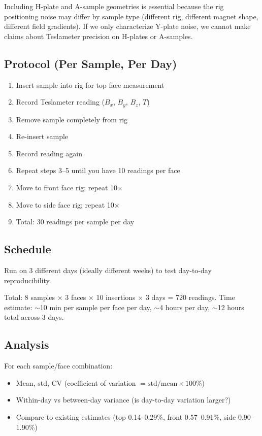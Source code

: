 \documentclass[11pt,letterpaper]{article}
\begin{document}
Including H-plate and A-sample geometries is essential because the rig
positioning noise may differ by sample type (different rig, different magnet
shape, different field gradients). If we only characterize Y-plate noise, we
cannot make claims about Teslameter precision on H-plates or A-samples.

\subsection{Protocol (Per Sample, Per Day)}

\begin{enumerate}[nosep]
  \item Insert sample into rig for top face measurement
  \item Record Teslameter reading ($B_x$, $B_y$, $B_z$, $T$)
  \item Remove sample completely from rig
  \item Re-insert sample
  \item Record reading again
  \item Repeat steps 3--5 until you have 10 readings per face
  \item Move to front face rig; repeat 10$\times$
  \item Move to side face rig; repeat 10$\times$
  \item Total: 30 readings per sample per day
\end{enumerate}

\subsection{Schedule}

Run on 3 different days (ideally different weeks) to test day-to-day
reproducibility.

Total: 8 samples $\times$ 3 faces $\times$ 10 insertions $\times$ 3 days = 720
readings. Time estimate: ${\sim}$10 min per sample per face per day, ${\sim}$4
hours per day, ${\sim}$12 hours total across 3 days.

\subsection{Analysis}

For each sample/face combination:
\begin{itemize}[nosep]
  \item Mean, std, CV (coefficient of variation $= \mathrm{std}/\mathrm{mean} \times 100\%$)
  \item Within-day vs between-day variance (is day-to-day variation larger?)
  \item Compare to existing estimates (top 0.14--0.29\%, front 0.57--0.91\%, side
    0.90--1.90\%)
\end{itemize}
\end{document}
